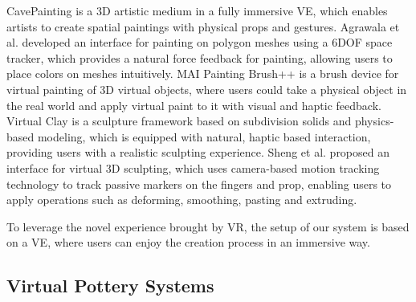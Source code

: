 \documentclass{svjour3}                     %
\begin{document}
CavePainting \cite{keefe2001cavepainting} is a 3D artistic medium in a fully immersive VE, which enables artists to create spatial paintings with physical props and gestures. Agrawala et al. \cite{agrawala19953d} developed an interface for painting on polygon meshes using a 6DOF space tracker, which provides a natural force feedback for painting, allowing users to place colors on meshes intuitively. MAI Painting Brush++ \cite{otsuki2017brush} is a brush device for virtual painting of 3D virtual objects, where users could take a physical object in the real world and apply virtual paint to it with visual and haptic feedback.
Virtual Clay \cite{mcdonnell2001virtual} is a sculpture framework based on subdivision solids and physics-based modeling, which is equipped with natural, haptic based interaction, providing users with a realistic sculpting experience. Sheng et al. \cite{sheng2006interface} proposed an interface for virtual 3D sculpting, which uses camera-based motion tracking technology to track passive markers on the fingers and prop, enabling users to apply operations such as deforming, smoothing, pasting and extruding.

To leverage the novel experience brought by VR, the setup of our system is based on a VE, where users can enjoy the creation process in an immersive way.

\subsection{Virtual Pottery Systems}
\label{sec:2.3}

\end{document}
